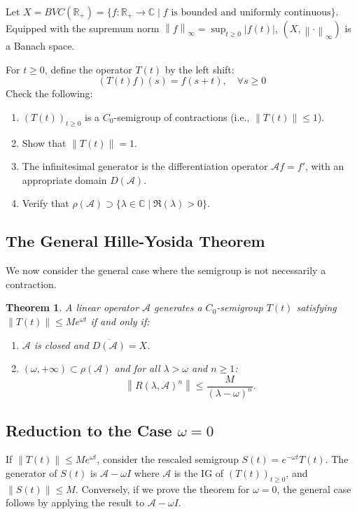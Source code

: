 \documentclass[12pt, oneside]{book}
\newtheorem{theo}{Theorem}[section]
\newcommand{\norm}[1]{\left\lVert#1\right\rVert}
\newcommand{\A}{\mathscr{A}}
\begin{document}
\begin{exercise}{}{}
Let $X = BVC(\mathbb{R}_+) = \{ f: \mathbb{R}_+ \to \mathbb{C} \mid f \text{ is bounded and uniformly continuous} \}$.
Equipped with the supremum norm $\norm{f}_\infty = \sup_{t \ge 0} |f(t)|$, $(X, \norm{\cdot}_\infty)$ is a Banach space.

For $t \ge 0$, define the operator $T(t)$ by the left shift:
$$
(T(t)f)(s) = f(s+t), \quad \forall s \ge 0
$$
Check the following:
\begin{enumerate}
    \item $(T(t))_{t \ge 0}$ is a $C_0$-semigroup of contractions (i.e., $\|T(t)\| \le 1$).
    \item Show that $\norm{T(t)} = 1$.
    \item The infinitesimal generator is the differentiation operator $\A f = f'$, with an appropriate domain $D(\A)$.
    \item Verify that $\rho(\A) \supset \{ \lambda \in \mathbb{C} \mid \Re(\lambda) > 0 \}$.
\end{enumerate}
\end{exercise}

\pagebreak

\subsection{The General Hille-Yosida Theorem}

We now consider the general case where the semigroup is not necessarily a contraction.

\begin{theo}
A linear operator $\A$ generates a $C_0$-semigroup $T(t)$ satisfying $\norm{T(t)} \le M e^{\omega t}$ if and only if:
\begin{enumerate}[label=(\roman*)]
	\item $\A$ is closed and $\overline{D(\A)} = X$.
    \item $(\omega, +\infty) \subset \rho(\A)$ and for all $\lambda > \omega$ and $n \ge 1$:
    $$
    \norm{R(\lambda, \A)^n} \le \frac{M}{(\lambda - \omega)^n}.
    $$
\end{enumerate}
\end{theo}

\subsection{\texorpdfstring{Reduction to the Case $\omega = 0$}{Reduction to the case of uniformly bounded}}
If $\norm{T(t)} \le M e^{\omega t}$, consider the rescaled semigroup $S(t) = e^{-\omega t}T(t)$. The generator of $S(t)$ is $\A - \omega I$ where $\A$ is the IG of $\left(T(t)\right)_{t \ge 0}$, and $\norm{S(t)} \le M$. Conversely, if we prove the theorem for $\omega = 0$, the general case follows by applying the result to $\A - \omega I$.
\end{document}

